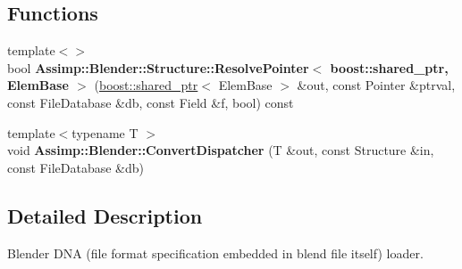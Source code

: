 \subsection*{Functions}
\begin{DoxyCompactItemize}
\item 
\hypertarget{namespace_assimp_1_1_blender_abb35d064a7212ef7cb0fb6be17834a3e}{{\footnotesize template$<$$>$ }\\bool {\bfseries Assimp\+::\+Blender\+::\+Structure\+::\+Resolve\+Pointer$<$ boost\+::shared\+\_\+ptr, Elem\+Base $>$} (\hyperlink{classboost_1_1shared__ptr}{boost\+::shared\+\_\+ptr}$<$ Elem\+Base $>$ \&out, const Pointer \&ptrval, const File\+Database \&db, const Field \&f, bool) const }\label{namespace_assimp_1_1_blender_abb35d064a7212ef7cb0fb6be17834a3e}

\item 
\hypertarget{namespace_assimp_1_1_blender_a1f31a36d9ff0e2334fd0ed6dd932a290}{{\footnotesize template$<$typename T $>$ }\\void {\bfseries Assimp\+::\+Blender\+::\+Convert\+Dispatcher} (T \&out, const Structure \&in, const File\+Database \&db)}\label{namespace_assimp_1_1_blender_a1f31a36d9ff0e2334fd0ed6dd932a290}

\end{DoxyCompactItemize}


\subsection{Detailed Description}
Blender {\ttfamily D\+N\+A} (file format specification embedded in blend file itself) loader. 

